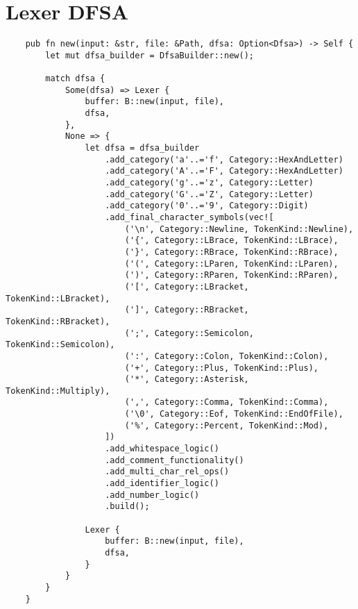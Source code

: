 

\appendix

\section{Lexer DFSA}
\label{sec:lexer-dfsa}

\begin{mainbox}{}
    \lstset{xleftmargin=0cm}
    \begin{lstlisting}
    pub fn new(input: &str, file: &Path, dfsa: Option<Dfsa>) -> Self {
        let mut dfsa_builder = DfsaBuilder::new();

        match dfsa {
            Some(dfsa) => Lexer {
                buffer: B::new(input, file),
                dfsa,
            },
            None => {
                let dfsa = dfsa_builder
                    .add_category('a'..='f', Category::HexAndLetter)
                    .add_category('A'..='F', Category::HexAndLetter)
                    .add_category('g'..='z', Category::Letter)
                    .add_category('G'..='Z', Category::Letter)
                    .add_category('0'..='9', Category::Digit)
                    .add_final_character_symbols(vec![
                        ('\n', Category::Newline, TokenKind::Newline),
                        ('{', Category::LBrace, TokenKind::LBrace),
                        ('}', Category::RBrace, TokenKind::RBrace),
                        ('(', Category::LParen, TokenKind::LParen),
                        (')', Category::RParen, TokenKind::RParen),
                        ('[', Category::LBracket, TokenKind::LBracket),
                        (']', Category::RBracket, TokenKind::RBracket),
                        (';', Category::Semicolon, TokenKind::Semicolon),
                        (':', Category::Colon, TokenKind::Colon),
                        ('+', Category::Plus, TokenKind::Plus),
                        ('*', Category::Asterisk, TokenKind::Multiply),
                        (',', Category::Comma, TokenKind::Comma),
                        ('\0', Category::Eof, TokenKind::EndOfFile),
                        ('%', Category::Percent, TokenKind::Mod),
                    ])
                    .add_whitespace_logic()
                    .add_comment_functionality()
                    .add_multi_char_rel_ops()
                    .add_identifier_logic()
                    .add_number_logic()
                    .build();

                Lexer {
                    buffer: B::new(input, file),
                    dfsa,
                }
            }
        }
    }
    \end{lstlisting}
\end{mainbox}

